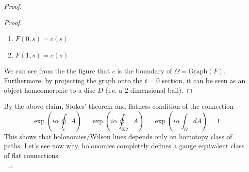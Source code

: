 \documentclass[11pt]{article}
\theoremstyle{definition}
\numberwithin{equation}{section}
\begin{document}
\begin{proof}
\begin{proof}
\begin{enumerate}
        \item $F(0,s) = c(s)$
        \item $F(1,s) = e(s)$
    \end{enumerate}
We can see from the the figure that $c$ is the boundary of $\Omega = \text{Graph}(F)$. Furthermore, by projecting the graph onto the $t=0$ section, it can be seen as an object homeomorphic to a disc $D$ (i.e. a $2$ dimensional ball).
\end{proof}
By the above claim, Stokes' theorem and flatness condition of the connection
\begin{equation}
    \exp(i \alpha \oint_c A) = \exp(i \alpha \oint_{\partial \Omega} A)  = \exp(i \alpha \int_{\Omega} dA) = 1
\end{equation}
This shows that holonomies/Wilson lines depends only on homotopy class of paths. Let's see now why, holonomies completely defines a gauge equivalent class of flat connections. \\


\end{proof}
\end{document}
